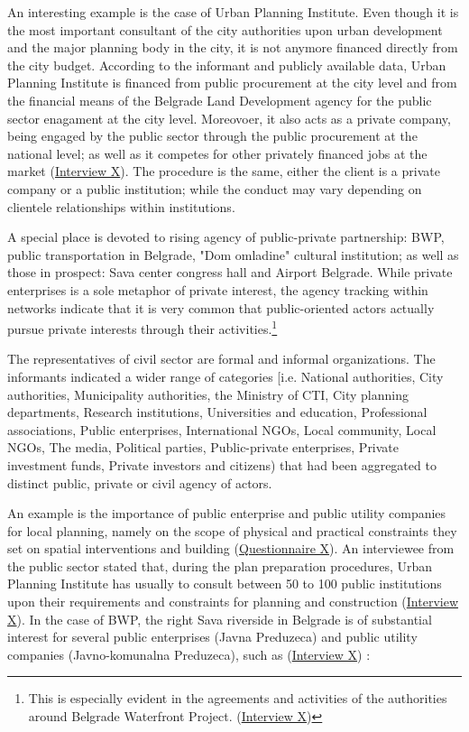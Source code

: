 \documentclass[11pt]{report}
\begin{document}
An interesting example is the case of Urban Planning Institute. Even though it is the most important consultant of the city authorities upon urban development and the major planning body in the city, it is not anymore financed directly from the city budget.
According to the informant and publicly available data, Urban Planning Institute is financed from public procurement at the city level and from the financial means of the Belgrade Land Development agency for the public sector enagament at the city level.
Moreovoer, it also acts as a private company, being engaged by the public sector through the public procurement at the national level; as well as it competes for other privately financed jobs at the market (\href{InterviewX}{Interview X}).
The procedure is the same, either the client is a private company or a public institution; while the conduct may vary depending on clientele relationships within institutions.

A special place is devoted to rising agency of public-private partnership: BWP, public transportation in Belgrade, "Dom omladine" cultural institution; as well as those in prospect: Sava center congress hall and Airport Belgrade. 
While private enterprises is a sole metaphor of private interest, the agency tracking within networks indicate that it is very common that public-oriented actors actually pursue private interests through their activities.\footnote{This is especially evident in the agreements and activities of the authorities around Belgrade Waterfront Project. (\href{InterviewX}{Interview X})}

The representatives of civil sector are formal and informal organizations. 
The informants indicated a wider range of categories [i.e. National authorities, City authorities, Municipality authorities, the Ministry of CTI, City planning departments, Research institutions, Universities and education, Professional associations, Public enterprises, International NGOs, Local community, Local NGOs, The media, Political parties, Public-private enterprises, Private investment funds, Private investors and citizens) that had been aggregated to distinct public, private or civil agency of actors.

An example is the importance of public enterprise and public utility companies for local planning, namely on the scope of physical and practical constraints they set on spatial interventions and building (\href{Questionnaire Experts Post-socialist}{Questionnaire X}).
An interviewee from the public sector stated that, during the plan preparation procedures, Urban Planning Institute has usually to consult between 50 to 100 public institutions upon their requirements and constraints for planning and construction (\href{InterviewX}{Interview X}).
In the case of BWP, the right Sava riverside in Belgrade is of substantial interest for several public enterprises (Javna Preduzeca) and public utility companies (Javno-komunalna Preduzeca), such as (\href{InterviewX}{Interview X})
:
\end{document}
